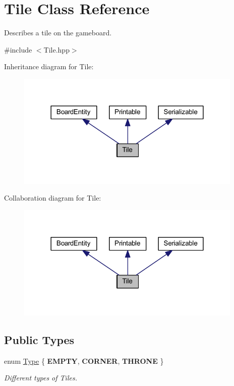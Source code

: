 \hypertarget{class_tile}{\section{Tile Class Reference}
\label{class_tile}
}


Describes a tile on the gameboard.  




{\ttfamily \#include $<$Tile.\-hpp$>$}



Inheritance diagram for Tile\-:
\nopagebreak
\begin{figure}[H]
\begin{center}
\leavevmode
\includegraphics[width=306pt]{class_tile__inherit__graph}
\end{center}
\end{figure}


Collaboration diagram for Tile\-:
\nopagebreak
\begin{figure}[H]
\begin{center}
\leavevmode
\includegraphics[width=306pt]{class_tile__coll__graph}
\end{center}
\end{figure}
\subsection*{Public Types}
\begin{DoxyCompactItemize}
\item 
enum \hyperlink{class_tile_afa5ef05a7f2ea1f3e44398c001abc738}{Type} \{ {\bfseries E\-M\-P\-T\-Y}, 
{\bfseries C\-O\-R\-N\-E\-R}, 
{\bfseries T\-H\-R\-O\-N\-E}
 \}
\begin{DoxyCompactList}\small\item\em Different types of Tiles. \end{DoxyCompactList}\end{DoxyCompactItemize}
